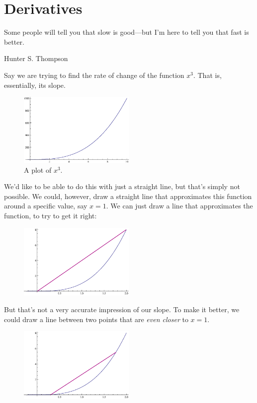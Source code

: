 \chapter{Derivatives}\label{ch:derivatives}
\epigraph{Some people will tell you that slow is good---but I'm here to tell you that fast is better.}{Hunter S. Thompson}%

Say we are trying to find the rate of change of the function $x^3$.
That is, essentially, its slope.
\begin{figure}[H]
  \begin{center}
    \includegraphics[width=0.5\textwidth]{continuous/derivatives/x3.eps}
  \end{center}
  \caption{A plot of $x^3$.}
\end{figure}
We'd like to be able to do this with just a straight line, but that's simply not possible.
We could, however, draw a straight line that approximates this function around a specific value, say $x=1$.
We can just draw a line that approximates the function, to try to get it right:
\begin{figure}[H]
  \begin{center}
    \includegraphics[width=0.5\textwidth]{continuous/derivatives/x3_1.eps}
  \end{center}
\end{figure}
But that's not a very accurate impression of our slope.
To make it better, we could draw a line between two points that are \emph{even closer} to $x=1$.
\begin{figure}[H]
  \begin{center}
    \includegraphics[width=0.5\textwidth]{continuous/derivatives/x3_2.eps}
  \end{center}
\end{figure}
